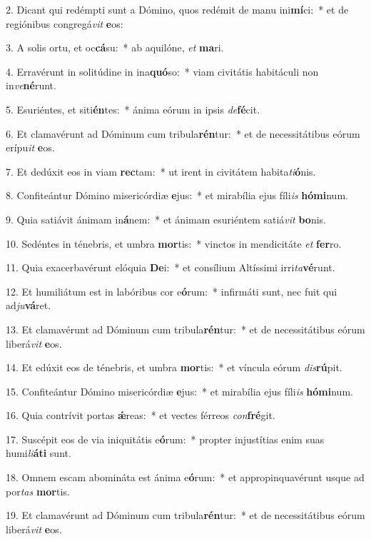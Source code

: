 2. Dicant qui redémpti sunt a Dómino, quos redémit de manu ini\textbf{mí}ci:~*  et de regiónibus congregá\textit{vit} \textbf{e}os:\

3. A solis ortu, et oc\textbf{cá}su:~*  ab aquilóne, \textit{et} \textbf{ma}ri.\

4. Erravérunt in solitúdine in ina\textbf{quó}so:~*  viam civitátis habitáculi non in\textit{ve}\textbf{né}runt.\

5. Esuriéntes, et siti\textbf{én}tes:~*  ánima eórum in ipsis \textit{de}\textbf{fé}cit.\

6. Et clamavérunt ad Dóminum cum tribula\textbf{rén}tur:~*  et de necessitátibus eórum erípu\textit{it} \textbf{e}os.\

7. Et dedúxit eos in viam \textbf{rec}tam:~*  ut irent in civitátem habita\textit{ti}\textbf{ó}nis.\

8. Confiteántur Dómino misericórdiæ \textbf{e}jus:~*  et mirabília ejus fíli\textit{is} \textbf{hó}\textbf{mi}num.\

9. Quia satiávit ánimam in\textbf{á}nem:~*  et ánimam esuriéntem satiá\textit{vit} \textbf{bo}nis.\

10. Sedéntes in ténebris, et umbra \textbf{mor}tis:~*  vinctos in mendicitáte \textit{et} \textbf{fer}ro.\

11. Quia exacerbavérunt elóquia \textbf{De}i:~*  et consílium Altíssimi irri\textit{ta}\textbf{vé}runt.\

12. Et humiliátum est in labóribus cor e\textbf{ó}rum:~*  infirmáti sunt, nec fuit qui ad\textit{ju}\textbf{vá}ret.\

13. Et clamavérunt ad Dóminum cum tribula\textbf{rén}tur:~*  et de necessitátibus eórum liberá\textit{vit} \textbf{e}os.\

14. Et edúxit eos de ténebris, et umbra \textbf{mor}tis:~*  et víncula eórum \textit{dis}\textbf{rú}pit.\

15. Confiteántur Dómino misericórdiæ \textbf{e}jus:~*  et mirabília ejus fíli\textit{is} \textbf{hó}\textbf{mi}num.\

16. Quia contrívit portas \textbf{ǽ}reas:~*  et vectes férreos \textit{con}\textbf{fré}git.\

17. Suscépit eos de via iniquitátis e\textbf{ó}rum:~*  propter injustítias enim suas humi\textit{li}\textbf{á}\textbf{ti} sunt.\

18. Omnem escam abomináta est ánima e\textbf{ó}rum:~*  et appropinquavérunt usque ad por\textit{tas} \textbf{mor}tis.\

19. Et clamavérunt ad Dóminum cum tribula\textbf{rén}tur:~*  et de necessitátibus eórum liberá\textit{vit} \textbf{e}os.\

